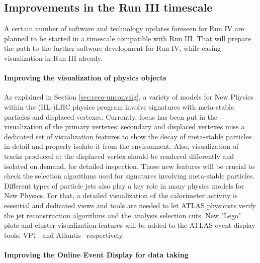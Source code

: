 \subsection{Improvements in the Run III timescale}

A certain number of software and technology updates foreseen for Run IV are planned to be started in a timescale compatible with Run III. That will prepare the path to the further software development for Run IV, while easing visualization in Run III already. 



\paragraph{Improving the visualization of physics objects}

As explained in Section \ref{sec:reco-unconvsig}, a variety of models for New Physics within the (HL-)LHC physics program involve signatures with meta-stable particles and displaced vertexes. 
Currently, focus has been put in the visualization of the primary vertexes; secondary and displaced vertexes miss a dedicated set of visualization features to show the decay of meta-stable particles in detail and properly isolate it from the environment. Also, visualization of tracks produced at the displaced vertex should be rendered differently and isolated on demand, for detailed inspection. Those new  features will be crucial to check the selection algorithms used for signatures involving meta-stable particles.
Different types of particle jets also play a key role in many physics models for New Physics. For that, a detailed visualization of the calorimeter activity is essential and dedicated views and tools are needed to let ATLAS physicists verify the jet reconstruction algorithms and the analysis selection cuts. 
New "Lego" plots and cluster visualization features will be added to the ATLAS event display tools, VP1~\cite{ref:vp1-web} and Atlantis~\cite{ref:atlantis-web} respectively. 


\paragraph{Improving the Online Event Display for data taking}


